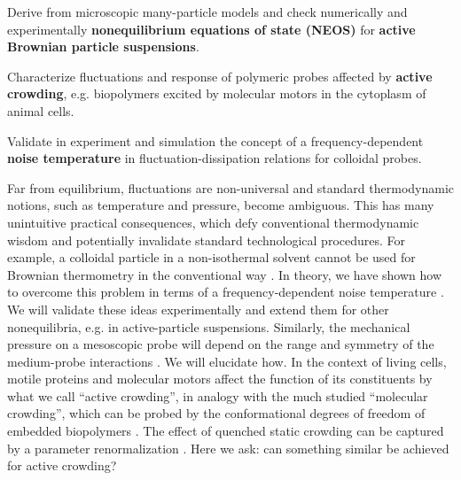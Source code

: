 \begin{workpackage}[id=WPactive,wphases=0-48,
  short=Active Particle Suspensions,%
  title=Probing active particle suspensions with colloids and polymers,
  lead=ULEI,
  ULEIRM=96,UNIPDRM=6,USTUTTRM=2]

\newrefsection

\begin{mdframed}
\mobjectives
%
  \begin{compactitem}
  \item Derive from microscopic many-particle models and check numerically and experimentally 
  \textbf{nonequilibrium equations of state (NEOS)} for  \textbf{active Brownian particle suspensions}.
  \item Characterize fluctuations and response of polymeric probes affected by \textbf{active
    crowding}, e.g. biopolymers excited by molecular motors in the cytoplasm of animal cells.
  \item Validate in experiment and simulation the concept of a frequency-dependent \textbf{noise temperature} 
  in fluctuation-dissipation relations for colloidal probes.
  \end{compactitem}

\mdescription
%
Far from equilibrium, fluctuations are non-universal and standard thermodynamic notions,
such as temperature and pressure, become ambiguous. 
This has many unintuitive practical consequences, which defy conventional thermodynamic
wisdom and potentially invalidate standard technological procedures.
%
For example, a colloidal particle in a non-isothermal solvent cannot be used for Brownian thermometry 
in the conventional way \cite{rings-etal:2010,kroy:2014}. In theory, we have shown how to overcome this problem
in terms of a frequency-dependent noise temperature \cite{falasco-etal:2014}.
%
We will validate these ideas experimentally and extend them for other
nonequilibria, e.g. in active-particle suspensions.
%
Similarly, the mechanical pressure on a mesoscopic probe will depend on the range and symmetry 
of the medium-probe interactions \cite{solon-etal:2015}. We will elucidate how. 
%
In the context of living cells, motile proteins and molecular motors affect the function
of its constituents by what  we call ``active crowding'', in analogy with the much studied ``molecular crowding'',
which can be probed by the conformational degrees of freedom of embedded biopolymers  \cite{otto-etal:2013}.
%
The effect of quenched static crowding can be captured by a parameter renormalization \cite{schoebl-etal:2014}.  
%
Here we ask: can something similar be achieved for active crowding?
\end{mdframed}


\end{workpackage}
